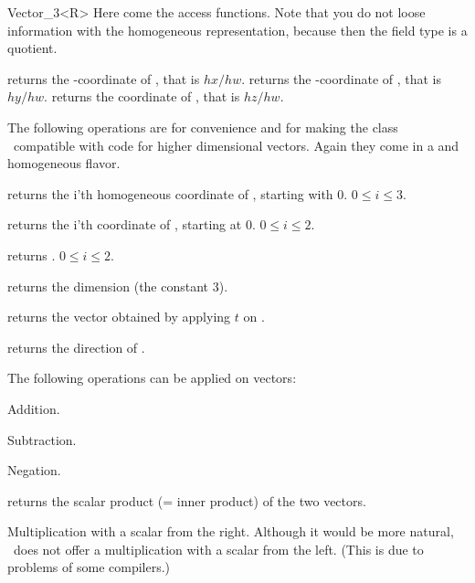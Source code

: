 \begin{ccRefClass} {Vector_3<R>}
Here come the  access functions. Note that you do not loose
information with the homogeneous representation, because then the field
type is a quotient.


       {returns the -coordinate of \ccVar, that is $hx/hw$.}
\ccGlue
{}
       {returns the -coordinate of \ccVar, that is $hy/hw$.}
\ccGlue
{}
       {returns the  coordinate of \ccVar, that is $hz/hw$.}

The following operations are for convenience and for making the
class \ccRefName\ compatible with code for higher dimensional vectors.
Again they come in a  and homogeneous flavor.

       {returns the i'th homogeneous coordinate of \ccVar, starting with 0.
        \ccPrecond $0\leq i \leq 3$.}

       {returns the i'th  coordinate of \ccVar, starting at 0.
        \ccPrecond $0\leq i \leq 2$.}

       {returns  .
        \ccPrecond $0\leq i \leq 2$.}

       {returns the dimension (the constant 3).}

       {returns the vector obtained by applying $t$ on \ccVar.}

       {returns the direction of \ccVar.}


The following operations can be applied on vectors:

       {Addition.}

       {Subtraction.}

       {Negation.}

       {returns the scalar product (= inner product) of the two vectors.}


       {Multiplication with a scalar from the right. Although it would
        be more natural, \cgal\ does not offer a multiplication with a 
        scalar from the left. (This is due to problems of some compilers.)}



\end{ccRefClass}
